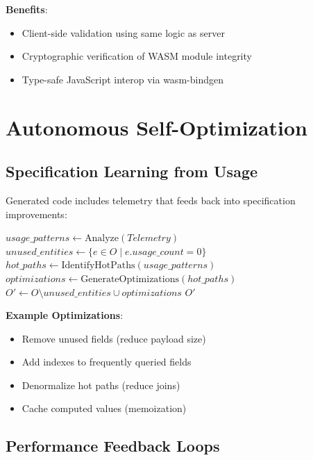 \textbf{Benefits}:
\begin{itemize}
    \item Client-side validation using same logic as server
    \item Cryptographic verification of WASM module integrity
    \item Type-safe JavaScript interop via wasm-bindgen
\end{itemize}

\section{Autonomous Self-Optimization}

\subsection{Specification Learning from Usage}

Generated code includes telemetry that feeds back into specification improvements:

\begin{algorithm}
\caption{Autonomous Specification Optimization}
\begin{algorithmic}[1]
    \State $usage\_patterns \gets \text{Analyze}(Telemetry)$
    \State $unused\_entities \gets \{e \in O \mid e.usage\_count = 0\}$
    \State $hot\_paths \gets \text{IdentifyHotPaths}(usage\_patterns)$
    \State $optimizations \gets \text{GenerateOptimizations}(hot\_paths)$
    \State $O' \gets O \setminus unused\_entities \cup optimizations$
    \State \Return $O'$
\EndProcedure
\end{algorithmic}
\end{algorithm}

\textbf{Example Optimizations}:
\begin{itemize}
    \item Remove unused fields (reduce payload size)
    \item Add indexes to frequently queried fields
    \item Denormalize hot paths (reduce joins)
    \item Cache computed values (memoization)
\end{itemize}

\subsection{Performance Feedback Loops}

